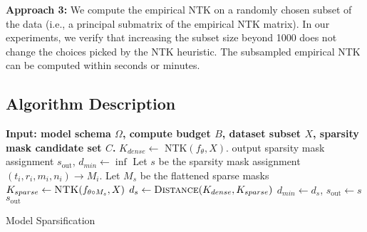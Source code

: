 \textbf{Approach 3:} We compute the empirical NTK on a randomly chosen subset of the data (i.e., a principal submatrix of the empirical NTK matrix).
In our experiments, we verify that increasing the subset size beyond 1000 does not change the choices picked by the NTK heuristic.
The subsampled empirical NTK can be computed within seconds or minutes.

\subsection{Algorithm Description}
\label{sec:algorithm_description}












\begin{algorithm}[t]
{\small
    \begin{algorithmic}[1]
        \State \textbf{Input: model schema $\Omega$, compute budget $B$, dataset subset $X$, sparsity mask candidate set $C$.}
        \State $K_{dense} \leftarrow$ \textsc{NTK}$(f_\theta, X)$. 
        \State output sparsity mask assignment $s_\mathrm{out}$, $d_{min} \leftarrow \inf$
         
            \State Let $s$ be the sparsity mask assignment $(t_i, r_i, m_i, n_i) \to M_i$.
             
                \State Let $M_s$ be the flattened sparse masks
                \State $K_{sparse} \leftarrow \textsc{NTK}(f_{\theta \circ M_s}, X)$
                \State $d_s \leftarrow \textsc{Distance}(K_{dense}, K_{sparse})$ 
                    \State $d_{min} \leftarrow d_s$, $s_\mathrm{out} \leftarrow s$
                \EndIf
            \EndIf
        \EndFor
        \State\Return $s_\mathrm{out}$ 
    \end{algorithmic}
    }
    \caption{Model Sparsification}\label{algo:pre}
    \end{algorithm}



